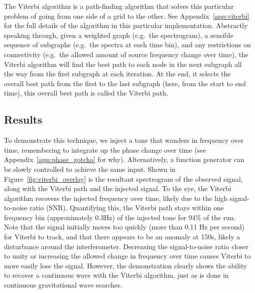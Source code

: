 \documentclass[prb,preprint]{revtex4-1}
\begin{document}
The Viterbi algorithm is a path-finding algorithm that solves this particular problem of going from one side of a grid to the other. See Appendix~\ref{app:viterbi} for the full details of the algorithm in this particular implementation.
Abstractly speaking through, given a weighted graph (e.g.\ the spectrogram), a sensible sequence of subgraphs (e.g.\ the spectra at each time bin), and any restrictions on connectivity (e.g.\ the allowed amount of source frequency change over time), the Viterbi algorithm will find the best path to each node in the next subgraph all the way from the first subgraph at each iteration. At the end, it selects the overall best path from the first to the last subgraph (here, from the start to end time), this overall best path is called the Viterbi path.

\subsection{Results}

To demonstrate this technique, we inject a tone that wanders in frequency over time, remembering to integrate up the phase change over time (see Appendix~\ref{app:phase_gotcha} for why). Alternatively, a function generator can be slowly controlled to achieve the same input. Shown in Figure~\ref{fig:viterbi_overlay} is the resultant spectrogram of the observed signal, along with the Viterbi path and the injected signal.
To the eye, the Viterbi algorithm recovers the injected frequency over time, likely due to the high signal-to-noise ratio (SNR). Quantifying this, the Viterbi path stays within one frequency bin (approximately 0.3Hz) of the injected tone for 94\% of the run. Note that the signal initially moves too quickly (more than 0.11 Hz per second) for Viterbi to track, and that there appears to be an anomaly at 150s, likely a disturbance around the interferometer.
Decreasing the signal-to-noise ratio closer to unity or increasing the allowed change in frequency over time causes Viterbi to more easily lose the signal. However, the demonstration clearly shows the ability to recover a continuous wave with the Viterbi algorithm, just as is done in continuous gravitational wave searches.
\end{document}
